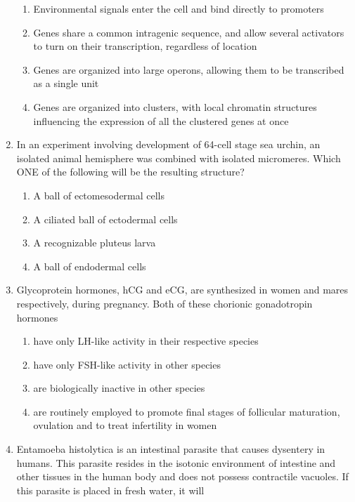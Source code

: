 \documentclass[journal,12pt,onecolumn]{IEEEtran}
\begin{document}
\begin{enumerate}[label=\arabic*.,resume]
\begin{enumerate}[label=(\Alph*)]
\item Environmental signals enter the cell and bind directly to promoters
\item Genes share a common intragenic sequence, and allow several activators to turn on their transcription, regardless of location
\item Genes are organized into large operons, allowing them to be transcribed as a single unit
\item Genes are organized into clusters, with local chromatin structures influencing the expression of all the clustered genes at once
\end{enumerate}

\item In an experiment involving development of 64-cell stage sea urchin, an isolated animal hemisphere was combined with isolated micromeres. Which ONE of the following will be the resulting structure?

\begin{multicols}{2}
\begin{enumerate}[label=(\Alph*)]
\item A ball of ectomesodermal cells
\item A ciliated ball of ectodermal cells
\item A recognizable pluteus larva
\item A ball of endodermal cells
\end{enumerate}
\end{multicols}

\item Glycoprotein hormones, hCG and eCG, are synthesized in women and mares respectively, during pregnancy. Both of these chorionic gonadotropin hormones
\begin{enumerate}[label=(\Alph*)]
\item have only LH-like activity in their respective species
\item have only FSH-like activity in other species
\item are biologically inactive in other species
\item are routinely employed to promote final stages of follicular maturation, ovulation and to treat infertility in women
\end{enumerate}

\item Entamoeba histolytica is an intestinal parasite that causes dysentery in humans. This parasite resides in the isotonic environment of intestine and other tissues in the human body and does not possess contractile vacuoles. If this parasite is placed in fresh water, it will


\end{enumerate}
\end{document}

